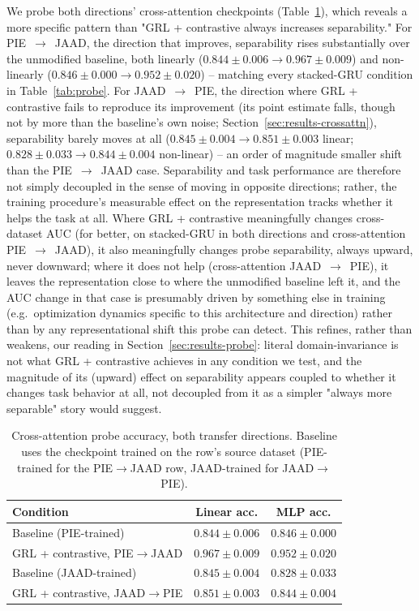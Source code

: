 We probe both directions' cross-attention checkpoints
(Table~\ref{tab:probe-crossattn}), which reveals a more specific pattern
than "GRL + contrastive always increases separability." For
PIE~$\to$~JAAD, the direction that improves, separability rises
substantially over the unmodified baseline, both linearly
($0.844\pm0.006 \to 0.967\pm0.009$) and non-linearly
($0.846\pm0.000 \to 0.952\pm0.020$) -- matching every stacked-GRU
condition in Table~\ref{tab:probe}. For JAAD~$\to$~PIE, the direction
where GRL + contrastive fails to reproduce its improvement (its point
estimate falls, though not by more than the baseline's own noise;
Section~\ref{sec:results-crossattn}), separability barely moves at all
($0.845\pm0.004 \to 0.851\pm0.003$ linear; $0.828\pm0.033 \to
0.844\pm0.004$ non-linear) -- an order of magnitude smaller shift than
the PIE~$\to$~JAAD case. Separability and task performance are
therefore not simply decoupled in the sense of moving in opposite
directions; rather, the training procedure's measurable effect on the
representation tracks whether it helps the task at all. Where GRL +
contrastive meaningfully changes cross-dataset AUC (for better, on
stacked-GRU in both directions and cross-attention PIE~$\to$~JAAD), it
also meaningfully changes probe separability, always upward, never
downward; where it does not help (cross-attention JAAD~$\to$~PIE), it
leaves the representation close to where the unmodified baseline left
it, and the AUC change in that case is presumably driven by something
else in training (e.g.\ optimization dynamics specific to this
architecture and direction) rather than by any representational shift
this probe can detect. This refines, rather than weakens, our reading
in Section~\ref{sec:results-probe}: literal domain-invariance is not
what GRL + contrastive achieves in any condition we test, and the
magnitude of its (upward) effect on separability appears coupled to
whether it changes task behavior at all, not decoupled from it as a
simpler "always more separable" story would suggest.

\begin{table}[t]
\centering
\caption{Cross-attention probe accuracy, both transfer directions.
Baseline uses the checkpoint trained on the row's source dataset
(PIE-trained for the PIE$\to$JAAD row, JAAD-trained for JAAD$\to$PIE).}
\label{tab:probe-crossattn}
\begin{tabular}{lcc}
\toprule
Condition & Linear acc. & MLP acc. \\
\midrule
Baseline (PIE-trained) & $0.844\pm0.006$ & $0.846\pm0.000$ \\
GRL + contrastive, PIE$\to$JAAD & $0.967\pm0.009$ & $0.952\pm0.020$ \\
\midrule
Baseline (JAAD-trained) & $0.845\pm0.004$ & $0.828\pm0.033$ \\
GRL + contrastive, JAAD$\to$PIE & $0.851\pm0.003$ & $0.844\pm0.004$ \\
\bottomrule
\end{tabular}
\end{table}

